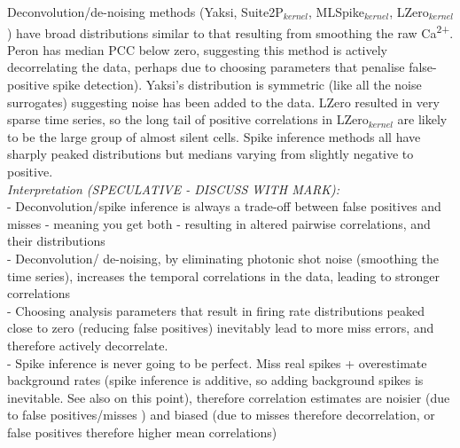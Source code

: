 \documentclass[a4paper,10pt,twocolumn]{article}
\begin{document}
Deconvolution/de-noising methods (Yaksi, Suite2P$_{kernel}$, MLSpike$_{kernel}$, LZero$_{kernel}$) have broad distributions similar to that resulting from smoothing the raw Ca\textsuperscript{2+}. Peron has median PCC below zero, suggesting this method is actively decorrelating the data, perhaps due to choosing parameters that penalise false-positive spike detection). Yaksi's distribution is symmetric (like all the noise surrogates) suggesting noise has been added to the data. LZero resulted in very sparse time series, so the long tail of positive correlations in LZero$_{kernel}$ are likely to be the large group of almost silent cells. Spike inference methods all have sharply peaked distributions but medians varying from slightly negative to positive.\\

\emph{Interpretation (SPECULATIVE - DISCUSS WITH MARK):}\\ 
\indent - Deconvolution/spike inference is always a trade-off between false positives and misses - meaning you get both - resulting in altered pairwise correlations, and their distributions\\
- Deconvolution/ de-noising, by eliminating photonic shot noise (smoothing the time series), increases the temporal correlations in the data, leading to stronger correlations\\
- Choosing analysis parameters that result in firing rate distributions peaked close to zero (reducing false positives) inevitably lead to more miss errors, and therefore actively decorrelate.\\
\indent - Spike inference is never going to be perfect. Miss real spikes + overestimate background rates (spike inference is additive, so adding background spikes is inevitable. See also \citealt{Ganmor2016-uf} on this point), therefore correlation estimates are noisier (due to false positives/misses ) and biased (due to misses therefore decorrelation, or false positives therefore higher mean correlations)\\




\end{document}
